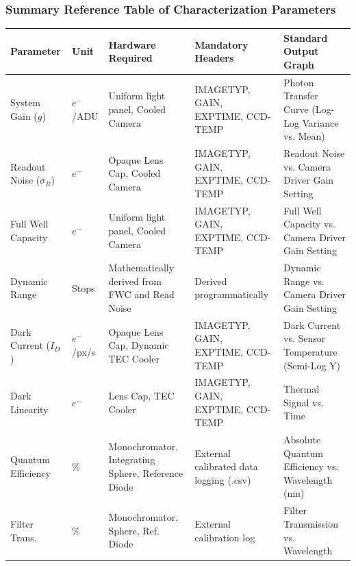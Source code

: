 \documentclass[11pt,a4paper]{article}
\begin{document}
\subsubsection{Summary Reference Table of Characterization Parameters}
\begin{center}
\begin{tabularx}{\textwidth}{|l|l|X|X|X|}
\hline
\textbf{Parameter} & \textbf{Unit} & \textbf{Hardware Required} & \textbf{Mandatory Headers} & \textbf{Standard Output Graph} \\
\hline
System Gain ($g$) & $e^-$/ADU & Uniform light panel, Cooled Camera & IMAGETYP, GAIN, EXPTIME, CCD-TEMP & Photon Transfer Curve (Log-Log Variance vs. Mean) \\
\hline
Readout Noise ($\sigma_R$) & $e^-$ & Opaque Lens Cap, Cooled Camera & IMAGETYP, GAIN, EXPTIME, CCD-TEMP & Readout Noise vs. Camera Driver Gain Setting \\
\hline
Full Well Capacity & $e^-$ & Uniform light panel, Cooled Camera & IMAGETYP, GAIN, EXPTIME, CCD-TEMP & Full Well Capacity vs. Camera Driver Gain Setting \\
\hline
Dynamic Range & Stops & Mathematically derived from FWC and Read Noise & Derived programmatically & Dynamic Range vs. Camera Driver Gain Setting \\
\hline
Dark Current ($I_D$) & $e^-$/px/s & Opaque Lens Cap, Dynamic TEC Cooler & IMAGETYP, GAIN, EXPTIME, CCD-TEMP & Dark Current vs. Sensor Temperature (Semi-Log Y) \\
\hline
Dark Linearity & $e^-$ & Lens Cap, TEC Cooler & IMAGETYP, GAIN, EXPTIME, CCD-TEMP & Thermal Signal vs. Time \\
\hline
Quantum Efficiency & \% & Monochromator, Integrating Sphere, Reference Diode & External calibrated data logging (.csv) & Absolute Quantum Efficiency vs. Wavelength (nm) \\
\hline
Filter Trans. & \% & Monochromator, Sphere, Ref. Diode & External calibration log & Filter Transmission vs. Wavelength \\
\hline
\end{tabularx}
\end{center}
\end{document}
